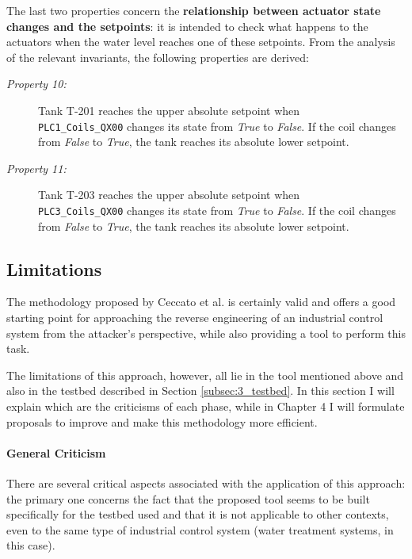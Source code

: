 The last two properties concern the \textbf{relationship between actuator state changes and the setpoints}: it is intended to check what happens to the actuators when the water level reaches one of these setpoints. From the analysis of the relevant invariants, the following properties are derived:

\begin{description}
	\item[\colorbox{backcolourtext}{\normalfont\textit{Property 10:}}] Tank T-201 reaches the upper absolute setpoint when\\ \texttt{PLC1\_Coils\_QX00} changes its state from \textit{True} to \textit{False}. If the coil changes from \textit{False} to \textit{True}, the tank reaches its absolute lower setpoint.
	
	\item[\colorbox{backcolourtext}{\normalfont\textit{Property 11:}}]
	Tank T-203 reaches the upper absolute setpoint when\\ \texttt{PLC3\_Coils\_QX00} changes its state from \textit{True} to \textit{False}. If the coil changes from \textit{False} to \textit{True}, the tank reaches its absolute lower setpoint.	 
\end{description}

\subsection{Limitations}
\label{subsec:3_ceccato_limitations}
The methodology proposed by Ceccato et al. is certainly valid and offers a good starting point for approaching the reverse engineering of an industrial control system from the attacker's perspective, while also providing a tool to perform this task.

\bigskip
The limitations of this approach, however, all lie in the tool mentioned above and also in the testbed described in Section \ref{subsec:3_testbed}. In this section I will explain which are the criticisms of each phase, while in Chapter 4 I will formulate proposals to improve and make this methodology more efficient.

\paragraph{General Criticism}
\label{par:3_limit_ceccato_general}
There are several critical aspects associated with the application of this approach: the primary one concerns the fact that the proposed tool seems to be built specifically for the testbed used and that it is not applicable to other contexts, even to the same type of industrial control system (water treatment systems, in this case). 

